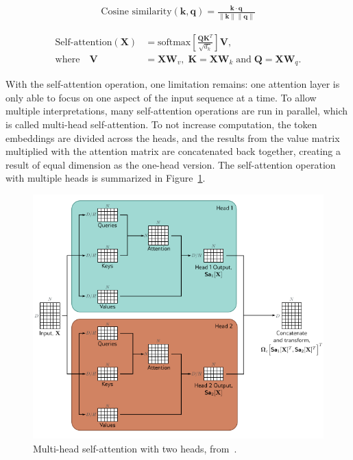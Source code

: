 \documentclass[english,twoside,openright]{UH_DS_MSc}
\begin{document}
\begin{align}
    \text{Cosine similarity}(\mathbf{k}, \mathbf{q}) = \frac{\mathbf{k} \cdot \mathbf{q}}{\|\mathbf{k}\| \|\mathbf{q}\|}
    \label{eq:cos-similarity}
\end{align}

\begin{align}
    \text{Self-attention}(\mathbf{X}) &= \text{softmax} \left[ \frac{\mathbf{Q}\mathbf{K}^T }{\sqrt{d_k}} \right] \mathbf{V}, \label{eq:self-attention} \\
    \nonumber\text{where} \quad \mathbf{V} &= \mathbf{X} \mathbf{W}_v, \; \mathbf{K} = \mathbf{X} \mathbf{W}_k \; \text{and} \; \mathbf{Q} = \mathbf{X} \mathbf{W}_q.
\end{align}

With the self-attention operation, one limitation remains: one attention layer is only able to focus on one aspect of the 
input sequence at a time. To allow multiple interpretations, many self-attention operations are run in parallel, which is 
called multi-head self-attention. To not increase computation, the token embeddings are divided across the heads, and the 
results from the value matrix multiplied with the attention matrix are concatenated back together, creating a result of 
equal dimension as the one-head version. The self-attention operation with multiple heads is summarized in Figure~\ref{fig:multi-head-self-attention}.

\begin{figure}[h]
    \centering
    \includegraphics*[scale=0.6]{images/multiheadattention.png}
    \caption{Multi-head self-attention with two heads, from~\cite{princebook}.}
    \label{fig:multi-head-self-attention}
\end{figure}
\end{document}
